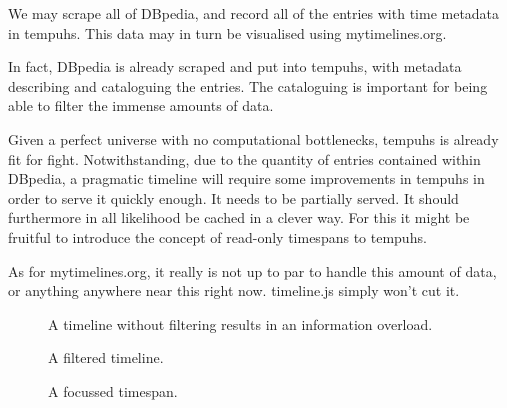 We may scrape all of DBpedia, and record all of the entries with time metadata 
in tempuhs. This data may in turn be visualised using mytimelines.org.

In fact, DBpedia is already scraped and put into tempuhs, with metadata 
describing and cataloguing the entries. The cataloguing is important for being
able to filter the immense amounts of data.

Given a perfect universe with no computational bottlenecks, tempuhs is already 
fit for fight. Notwithstanding, due to the quantity of entries contained 
within DBpedia, a pragmatic timeline will require some improvements in tempuhs 
in order to serve it quickly enough. It needs to be partially served. It 
should furthermore in all likelihood be cached in a clever way. For this it 
might be fruitful to introduce the concept of read-only timespans to tempuhs.

As for mytimelines.org, it really is not up to par to handle this amount of 
data, or anything anywhere near this right now. timeline.js simply won't cut 
it.

\begin{figure}[H]
  \centering
  \begin{scale}{0.3}
    
  \end{scale}
  \caption{A timeline without filtering results in an information overload.}
  \label{fig:overload}
\end{figure}

\begin{figure}[H]
  \centering
  \begin{scale}{0.3}
    
  \end{scale}
  \caption{A filtered timeline.}
  \label{fig:filtered}
\end{figure}

\begin{figure}[H]
  \centering
  \begin{scale}{0.3}
    
  \end{scale}
  \caption{A focussed timespan.}
  \label{fig:focussed}
\end{figure}
